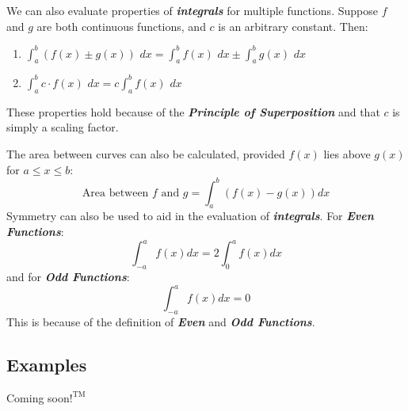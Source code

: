 \vspace{0.1in}
We can also evaluate properties of \textbf{\textit{integrals}} for multiple functions. Suppose $f$ and $g$ are both continuous functions, and $c$ is an arbitrary constant. Then:
%
\begin{enumerate}
\item $\int_a^b \left(f(x) \pm g(x)\right)$ $dx = \int_a^b f(x)$ $dx \pm \int_a^b g(x)$ $dx$\\
\item $\int_a^b c \cdot f(x)$ $dx = c\int_a^b f(x)$ $dx$
\end{enumerate}
%
These properties hold because of the \textbf{\textit{Principle of Superposition}} and that $c$ is simply a scaling factor.

\vspace{0.1in}
The area between curves can also be calculated, provided $f(x)$ lies above $g(x)$ for $a \leq x \leq b$:
%
\begin{equation}
\text{Area between $f$ and $g$} = \int_a^b\left(f(x) - g(x)\right)dx
\end{equation}
%
\vspace{0.1in}
Symmetry can also be used to aid in the evaluation of \textbf{\textit{integrals}}. For \textbf{\textit{Even Functions}}:
%
\begin{equation}
\int_{-a}^a f(x)dx = 2\int_0^a f(x)dx
\end{equation}
%
and for \textbf{\textit{Odd Functions}}:
%
\begin{equation}
\int_{-a}^a f(x)dx = 0
\end{equation}
%
This is because of the definition of \textbf{\textit{Even}} and \textbf{\textit{Odd Functions}}.

\begin{center}
\section*{\small Examples}
Coming soon$!^{\text{TM}}$
\end{center}